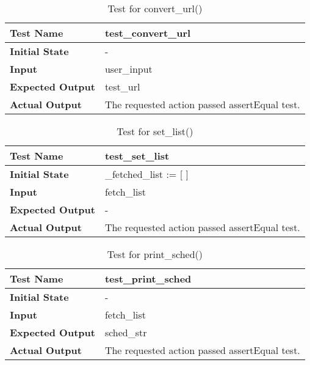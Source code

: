 \documentclass[12pt, titlepage]{article}
\begin{document}
		\begin{table}[!htbp]
		
			\begin{tabularx}{\textwidth}{|l|X|}
			
				\hline
				\textbf{Test Name} & test\_convert\_url
				\\ 
				\hline
				\textbf{Initial State} & - \\ 
				\hline
				\textbf{Input} & user\_input  \\ 
				\hline 
				\textbf{Expected Output} & test\_url \\ 
				\hline				
				\textbf{Actual Output} & The requested action passed assertEqual test. \\				
				\hline
			\end{tabularx}
			\caption{Test for convert\_url()}
			\label{Table}
		\end{table}
		
		\begin{table}[!htbp]			
			\begin{tabularx}{\textwidth}{|l|X|}
				\hline
				\textbf{Test Name} & test\_set\_list
				\\ 
				\hline
				\textbf{Initial State} & \_fetched\_list := [ ] \\ 
				\hline
				\textbf{Input} & fetch\_list  \\ 
				\hline 
				\textbf{Expected Output} & - \\ 
				\hline				
				\textbf{Actual Output} & The requested action passed assertEqual test. \\				
				\hline
			\end{tabularx}
			\caption{Test for set\_list()}
			\label{Table}
		\end{table}
		
		\begin{table}[!htbp]			
			\begin{tabularx}{\textwidth}{|l|X|}
				\hline
				\textbf{Test Name} & test\_print\_sched
				\\ 
				\hline
				\textbf{Initial State} & - \\ 
				\hline
				\textbf{Input} & fetch\_list  \\ 
				\hline 
				\textbf{Expected Output} & sched\_str \\ 
				\hline				
				\textbf{Actual Output} & The requested action passed assertEqual test. \\				
				\hline
			\end{tabularx}
			\caption{Test for print\_sched()}
			\label{Table}
		\end{table}
		
\end{document}
